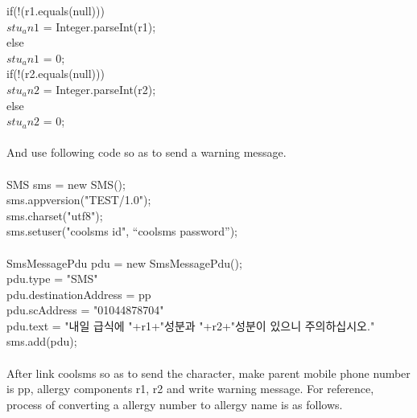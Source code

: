 \documentclass[a4paper,11pt]{IEEEtran}
\begin{document}
{{{{if(!(r1.equals(null)))\\
$stu_an1$ = Integer.parseInt(r1);\\
else\\
$stu_an1$ = 0;\\

if(!(r2.equals(null)))\\
$stu_an2$ = Integer.parseInt(r2);\\
else\\
$stu_an2$ = 0;\\
}\\
And use following code so as to send a warning message.\\
\\
SMS sms = new SMS();\\
        sms.appversion("TEST/1.0");\\
        sms.charset("utf8");\\
        sms.setuser("coolsms id", “coolsms password”);\\
\\
        SmsMessagePdu pdu = new SmsMessagePdu();\\
        pdu.type = "SMS"\\
        pdu.destinationAddress = pp\\
        pdu.scAddress = "01044878704"\\
        pdu.text = "내일 급식에 "+r1+"성분과 "+r2+"성분이 있으니 주의하십시오."\\
        sms.add(pdu);\\\\

After link coolsms so as to send the character, make parent mobile phone number is pp, allergy components r1, r2 and write warning message.
For reference, process of converting a allergy number to allergy name is as follows.\\\\

}}}
\end{document}
